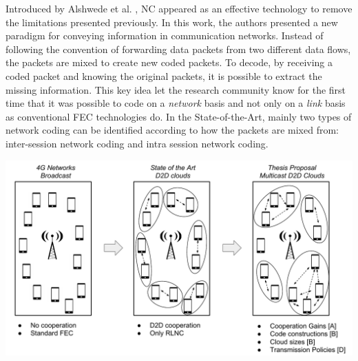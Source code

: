 Introduced by Alshwede et al. \cite{ahlswede2000network}, \ac{NC} appeared as an effective technology to remove the limitations presented previously. In this work, the authors presented a new paradigm for conveying information in communication networks. Instead of following the convention of forwarding data packets from two different data flows, the packets are mixed to create new coded packets. To decode, by receiving a coded packet and knowing the original packets, it is possible to extract the missing information. This key idea let the research community know for the first time that it was possible to code on a \textit{network} basis and not only on a \textit{link} basis as conventional \ac{FEC} technologies do. In the State-of-the-Art, mainly two types of network coding can be identified according to how the packets are mixed from: inter-session network coding and intra session network coding. 


\includegraphics[width=\textwidth]{introduction/figures/thesis-diagrams.pdf}
